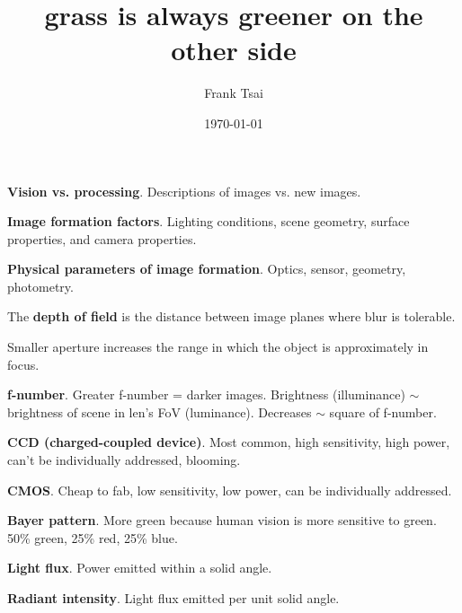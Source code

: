 \documentclass[twocolumn]{zett}
\title{grass is always greener on the other side}
\author{Frank Tsai}
\date{\today}
\begin{document}
\begin{node}
  \textbf{Vision vs. processing}.
  Descriptions of images vs. new images.
\end{node}

\begin{node}
  \textbf{Image formation factors}.
  Lighting conditions, scene geometry, surface properties, and camera properties.
\end{node}

\begin{node}
  \textbf{Physical parameters of image formation}.
  Optics, sensor, geometry, photometry.
\end{node}

\begin{node}
  The \textbf{depth of field} is the distance between image planes where blur is tolerable.
\end{node}

\begin{node}
  Smaller aperture increases the range in which the object is approximately in focus.
\end{node}

\begin{node}
  \textbf{f-number}.
  Greater f-number = darker images.
  Brightness (illuminance) $\sim$ brightness of scene in len's FoV (luminance).
  Decreases $\sim$ square of f-number.
\end{node}

\begin{node}
  \textbf{CCD (charged-coupled device)}.
  Most common, high sensitivity, high power, can't be individually addressed, blooming.
\end{node}

\begin{node}
  \textbf{CMOS}.
  Cheap to fab, low sensitivity, low power, can be individually addressed.
\end{node}

\begin{node}
  \textbf{Bayer pattern}.
  More green because human vision is more sensitive to green.
  50\% green, 25\% red, 25\% blue.
\end{node}

\begin{node}
  \textbf{Light flux}.
  Power emitted within a solid angle.
\end{node}

\begin{node}
  \textbf{Radiant intensity}.
  Light flux emitted per unit solid angle.
\end{node}
\end{document}

